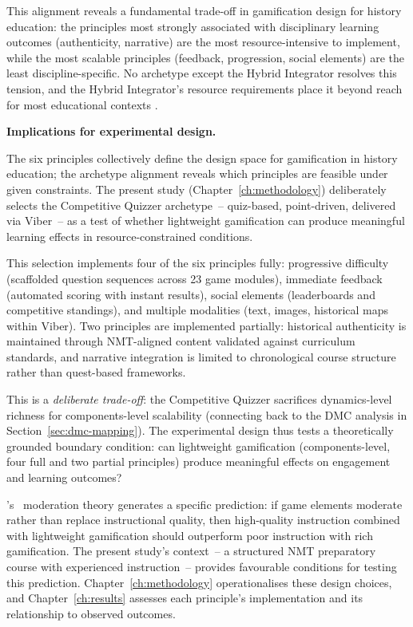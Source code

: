 

This alignment reveals a fundamental trade-off in gamification design for history education: the principles most strongly associated with disciplinary learning outcomes (authenticity, narrative) are the most resource-intensive to implement, while the most scalable principles (feedback, progression, social elements) are the least discipline-specific. No archetype except the Hybrid Integrator resolves this tension, and the Hybrid Integrator's resource requirements place it beyond reach for most educational contexts \cite{Werbach2012, Landers2014}.

\textbf{Implications for experimental design.} \label{sec:principle-implications}

The six principles collectively define the design space for gamification in history education; the archetype alignment reveals which principles are feasible under given constraints. The present study (Chapter~\ref{ch:methodology}) deliberately selects the Competitive Quizzer archetype~-- quiz-based, point-driven, delivered via Viber~-- as a test of whether lightweight gamification can produce meaningful learning effects in resource-constrained conditions.

This selection implements four of the six principles fully: progressive difficulty (scaffolded question sequences across 23 game modules), immediate feedback (automated scoring with instant results), social elements (leaderboards and competitive standings), and multiple modalities (text, images, historical maps within Viber). Two principles are implemented partially: historical authenticity is maintained through NMT-aligned content validated against curriculum standards, and narrative integration is limited to chronological course structure rather than quest-based frameworks.

This is a \textit{deliberate trade-off}: the Competitive Quizzer sacrifices dynamics-level richness for components-level scalability (connecting back to the DMC analysis in Section~\ref{sec:dmc-mapping}). The experimental design thus tests a theoretically grounded boundary condition: can lightweight gamification (components-level, four full and two partial principles) produce meaningful effects on engagement and learning outcomes? \cite{KorniienkoSemerikov2024, Werbach2012}

\citeauthor{Landers2014}'s~\cite{Landers2014} moderation theory generates a specific prediction: if game elements moderate rather than replace instructional quality, then high-quality instruction combined with lightweight gamification should outperform poor instruction with rich gamification. The present study's context~-- a structured NMT preparatory course with experienced instruction~-- provides favourable conditions for testing this prediction. Chapter~\ref{ch:methodology} operationalises these design choices, and Chapter~\ref{ch:results} assesses each principle's implementation and its relationship to observed outcomes.

